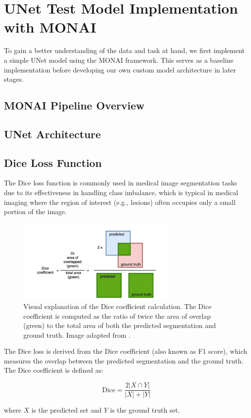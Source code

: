 \chapter{UNet Test Model Implementation with MONAI}
\label{ch:unet_model}
To gain a better understanding of the data and task at hand, we first implement a simple UNet model using the MONAI framework. This serves as a baseline implementation before developing our own custom model architecture in later stages.

\section{MONAI Pipeline Overview}
\label{sec:monai_pipeline}


\section{UNet Architecture}
\label{sec:unet_architecture}


\section{Dice Loss Function}
\label{sec:dice_loss}

The Dice loss function is commonly used in medical image segmentation tasks due to its effectiveness in handling class imbalance, which is typical in medical imaging where the region of interest (e.g., lesions) often occupies only a small portion of the image.

\begin{figure}[htbp]
    \centering
    \includegraphics[width=0.7\textwidth]{figures/dice_loss_illustration.png}
    \caption{Visual explanation of the Dice coefficient calculation. The Dice coefficient is computed as the ratio of twice the area of overlap (green) to the total area of both the predicted segmentation and ground truth. Image adapted from \cite{nevilledice2023}.}
    \label{fig:dice_illustration}
\end{figure}

The Dice loss is derived from the Dice coefficient (also known as F1 score), which measures the overlap between the predicted segmentation and the ground truth. The Dice coefficient is defined as:

\begin{equation}
\text{Dice} = \frac{2 |X \cap Y|}{|X| + |Y|}
\end{equation}

where $X$ is the predicted set and $Y$ is the ground truth set. 

